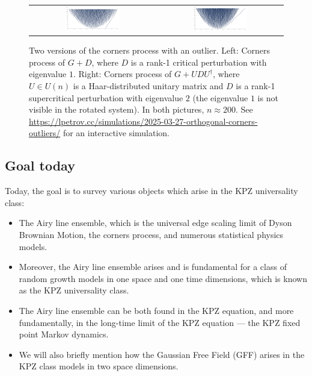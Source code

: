 \documentclass[letterpaper,11pt,oneside,reqno]{article}
\numberwithin{equation}{section}
\theoremstyle{definition}
\begin{document}
\begin{figure}[]
	\centering
	\begin{tabular}{cc}
		\includegraphics[width=0.45\textwidth]{pictures/outlier.png} &
		\includegraphics[width=0.45\textwidth]{pictures/rotated_outlier.png}
	\end{tabular}
	\caption{Two versions of the corners process with an outlier.
	Left: Corners process of $G+D$, where $D$ is a rank-1 critical perturbation with eigenvalue
	$1$. Right: Corners process of $G+UDU^\dagger$, where
	$U\in U(n)$ is a Haar-distributed unitary matrix and $D$
	is a rank-1 supercritical perturbation with eigenvalue $2$
	(the eigenvalue $1$ is not visible in the rotated system).
	In both pictures, $n\approx 200$. See
	\url{https://lpetrov.cc/simulations/2025-03-27-orthogonal-corners-outliers/}
	for an interactive simulation.}
	\label{fig:outlier-evolution}
\end{figure}


\subsection{Goal today}

Today, the goal is to survey various objects which arise in the KPZ universality class:
\begin{itemize}
	\item 
		The Airy line ensemble, which is 
		the universal edge scaling limit of Dyson Brownian Motion,
		the corners process, and numerous statistical physics models.
	\item 
		Moreover, the Airy line ensemble arises and 
		is fundamental for a class of random growth models
		in one space and one time dimensions, which is known as the KPZ universality class.
	\item 
		The Airy line ensemble can be both found in the KPZ equation, and 
		more fundamentally, in the long-time limit of the KPZ equation --- the 
		KPZ fixed point Markov dynamics. 
	\item We will also briefly mention how the Gaussian Free Field (GFF) arises in the KPZ class
		models in two space dimensions.
\end{itemize}
\end{document}

